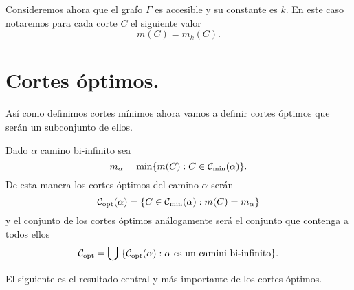 \documentclass[tesis.tex]{subfiles}
\begin{document}
Consideremos ahora que el grafo $\Gamma$ es accesible y su constante es $k$.
En este caso notaremos para cada corte $C$ el siguiente valor
\[
	m(C) = m_k(C).
\]

\section{Cortes óptimos.}

Así como definimos cortes mínimos ahora vamos a definir cortes óptimos que serán un subconjunto de ellos.

\begin{deff}
	Dado $\alpha$ camino bi-infinito sea
	\[
		m_\alpha = \min \{ m(C) : C \in {\cal C}_{\text{min}}(\alpha) \}.
	\]
	De esta manera los cortes óptimos del camino $\alpha$ serán
	\[
		{\cal C}_{\text{opt}}(\alpha) = \{ C \in {\cal C}_{\text{min}}(\alpha) : m(C) = m_\alpha  \}
	\]
	y el conjunto de los cortes óptimos análogamente será el conjunto que contenga a todos ellos
	\[
		{\cal C}_{\text{opt}} = \bigcup \ \{ {\cal C}_{\text{opt}}(\alpha) : \alpha \ \text{es un camini bi-infinito}  \}.
	\]
\end{deff}

El siguiente es el resultado central y más importante de los cortes óptimos.
\end{document}
